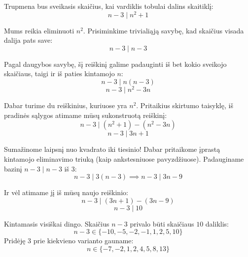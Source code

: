 \documentclass[11pt,a4paper]{scrartcl}
\begin{document}
\begin{solution}
Trupmena bus sveikasis skaičius, kai vardiklis tobulai dalins skaitiklį:
\begin{equation*} 
n - 3 \mid n^2 + 1 
\end{equation*}

Mums reikia eliminuoti \(n^2\). Prisiminkime trivialiąją savybę, kad skaičius visada dalija pats save:
\begin{equation*} 
n - 3 \mid n - 3 
\end{equation*}

Pagal daugybos savybę, šį reiškinį galime padauginti iš bet kokio sveikojo skaičiaus, taigi ir iš paties kintamojo \(n\):
\begin{equation*} 
n - 3 \mid n(n - 3) 
\end{equation*}
\begin{equation*} 
n - 3 \mid n^2 - 3n 
\end{equation*}

Dabar turime du reiškinius, kuriuose yra \(n^2\). Pritaikius skirtumo taisyklę, iš pradinės sąlygos atimame mūsų sukonstruotą reiškinį:
\begin{equation*} 
n - 3 \mid (n^2 + 1) - (n^2 - 3n) 
\end{equation*}
\begin{equation*} 
n - 3 \mid 3n + 1 
\end{equation*}

Sumažinome laipsnį nuo kvadrato iki tiesinio! Dabar pritaikome įprastą kintamojo eliminavimo triuką (kaip ankstesniuose pavyzdžiuose). Padauginame bazinį \(n - 3 \mid n - 3\) iš $3$:
\begin{equation*} 
n - 3 \mid 3(n - 3) \implies n - 3 \mid 3n - 9 
\end{equation*}

Ir vėl atimame jį iš mūsų naujo reiškinio:
\begin{equation*} 
n - 3 \mid (3n + 1) - (3n - 9) 
\end{equation*}
\begin{equation*} 
n - 3 \mid 10 
\end{equation*}

Kintamasis visiškai dingo. Skaičius \(n - 3\) privalo būti skaičiaus $10$ daliklis:
\begin{equation*} 
n - 3 \in \{-10, -5, -2, -1, 1, 2, 5, 10\} 
\end{equation*}
Pridėję $3$ prie kiekvieno varianto gauname:
\begin{equation*} 
n \in \{-7, -2, 1, 2, 4, 5, 8, 13\} 
\end{equation*}
\end{solution}
\end{document}
